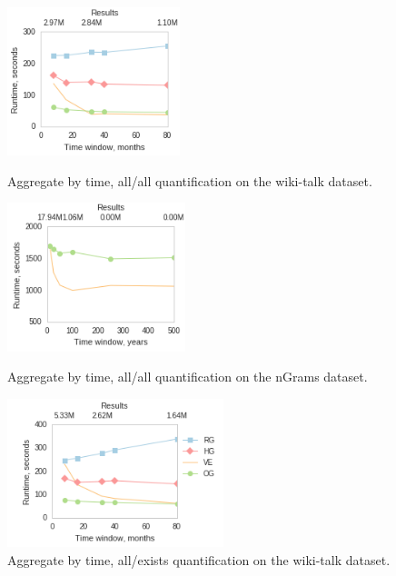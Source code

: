 \begin{figure}[h]
\begin{minipage}{2in}
\centering
\includegraphics[height=1.7in]{figs/agg_allall_wikitalk_vertices_build11_trimmed.png}
\caption{Aggregate by time, all/all quantification on the wiki-talk dataset.}
\label{fig:agg1}
\end{minipage}
\begin{minipage}{2in}
\centering
\includegraphics[height=1.7in]{figs/agg_allall_ngrams_edges_build11_trimmed.png}
\caption{Aggregate by time, all/all quantification on the nGrams dataset.}
\label{fig:agg2}
\end{minipage}
\begin{minipage}{2.6in}
\centering
\includegraphics[height=1.7in]{figs/agg_allexists_wikitalk_edges_build11.png}
\caption{Aggregate by time, all/exists quantification on the wiki-talk dataset.}
\label{fig:agg4}
\end{minipage}
\end{figure}

